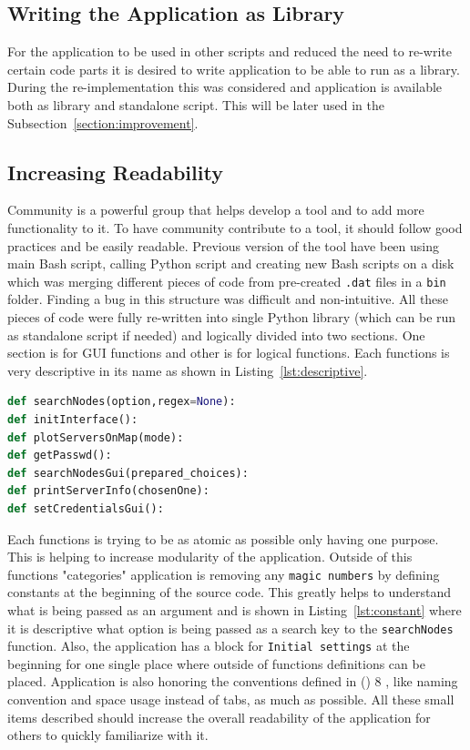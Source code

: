 \subsection{Writing the Application as Library}
For the application to be used in other scripts and reduced the need to re-write certain code parts it is desired to write application to be able to run as a library. During the re-implementation this was considered and application is available both as library and standalone script. This will be later used in the Subsection~\ref{section:improvement}.
\subsection{Increasing Readability}
Community is a powerful group that helps develop a tool and to add more functionality to it. To have community contribute to a tool, it should follow good practices and be easily readable. Previous version of the tool have been using main Bash script, calling Python script and creating new Bash scripts on a disk which was merging different pieces of code from pre-created \texttt{.dat} files in a \texttt{bin} folder. Finding a bug in this structure was difficult and non-intuitive. All these pieces of code were fully re-written into single Python library (which can be run as standalone script if needed) and logically divided into two sections. One section is for GUI functions and other is for logical functions. Each functions is very descriptive in its name as shown in Listing~\ref{lst:descriptive}. 

\begin{minipage}{\linewidth}
\begin{lstlisting}[language=Python, numbers=none, label={lst:descriptive}, caption=Example of Function Names, frame=single, showstringspaces=false, breaklines=true]
def searchNodes(option,regex=None):
def initInterface():
def plotServersOnMap(mode):
def getPasswd():
def searchNodesGui(prepared_choices):
def printServerInfo(chosenOne):
def setCredentialsGui():
\end{lstlisting}
\end{minipage}

Each functions is trying to be as atomic as possible only having one purpose. This is helping to increase modularity of the application. Outside of this functions "categories" application is removing any \texttt{magic numbers} by defining constants at the beginning of the source code. This greatly helps to understand what is being passed as an argument and is shown in Listing~\ref{lst:constant} where it is descriptive what option is being passed as a search key to the \texttt{searchNodes} function. Also, the application has a block for \texttt{Initial settings} at the beginning for one single place where outside of functions definitions can be placed. Application is also honoring the conventions defined in  () 8 \cite{pythonpep}, like naming convention and space usage instead of tabs, as much as possible. All these small items described should increase the overall readability of the application for others to quickly familiarize with it.

